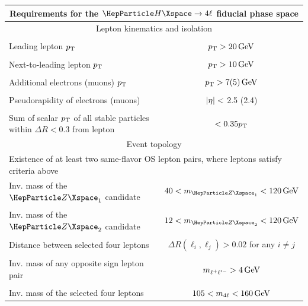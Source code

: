 \begin{table}[!htb]
	\centering
	\cmsTable
	{
		\begin{tabular}{lc}
			\multicolumn{2}{c}{Requirements for the $\Hllll$ fiducial phase space} \\
			\hline
			\multicolumn{2}{c}{Lepton kinematics and isolation} \\[\cmsTabSkip]
			\vspace{-0.4cm} & \\
			Leading lepton $p_{\mathrm{T}}$ & $p_{\mathrm{T}} > 20\,\text{Ge\hspace{-.08em}V}$ \\
			\vspace{-0.4cm} & \\
			Next-to-leading lepton $p_{\mathrm{T}}$ & $p_{\mathrm{T}} > 10\,\text{Ge\hspace{-.08em}V}$ \\
			\vspace{-0.4cm} & \\
			Additional electrons (muons) $p_{\mathrm{T}}$ & $p_{\mathrm{T}} > 7 (5)\,\text{Ge\hspace{-.08em}V}$ \\
			\vspace{-0.4cm} & \\
			Pseudorapidity of electrons (muons) & $\lvert \eta \rvert <$ 2.5 (2.4) \\
			\vspace{-0.4cm} & \\
			Sum of scalar $p_{\mathrm{T}}$ of all stable particles within $\Delta R < 0.3$ from lepton & $<0.35 p_{\mathrm{T}}$ \\[\cmsTabSkip]
			\multicolumn{2}{c}{Event topology} \\[\cmsTabSkip]
			\multicolumn{2}{l}{Existence of at least two same-flavor OS lepton pairs, where leptons satisfy criteria above} \\
			Inv. mass of the $\PZ_1$ candidate & $40 < m_{\PZ_{1}} < 120 \GeV$ \\
			\vspace{-0.4cm} & \\
			Inv. mass of the $\PZ_2$ candidate & $12 < m_{\PZ_{2}} < 120 \GeV$ \\
			\vspace{-0.4cm} & \\
			Distance between selected four leptons & $\Delta R(\ell_{i},\ell_{j})>0.02$ for any $i\neq j$  \\
			\vspace{-0.4cm} & \\
			Inv. mass of any opposite sign lepton pair & $m_{\ell^{+}\ell'^{-}}>4 \,\text{Ge\hspace{-.08em}V}$ \\
			\vspace{-0.4cm} & \\
			Inv. mass of the selected four leptons & $105 < m_{4\ell} < 160 \,\text{Ge\hspace{-.08em}V}$  \\
	\end{tabular}}
	\normalsize
\end{table}

